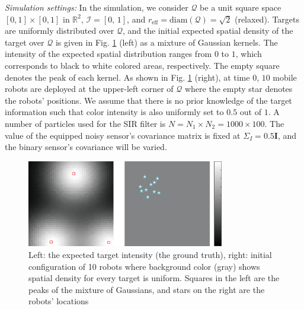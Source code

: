 \documentclass[journal]{IEEEtran}
\begin{document}
\textit{Simulation settings:}
In the simulation, we consider  $\mathcal{Q}$ be a unit square space $[0,1]\times [0,1]$ in $\mathbb{R}^2$, $\mathcal{I} = [0,\,1]$, and $r_{\text{eff}} = \text{diam}(\mathcal{Q})=\sqrt{2}$ (relaxed). 
Targets are uniformly distributed over $\mathcal{Q}$, and the initial expected spatial density of the target over $\mathcal{Q}$ is given in Fig. \ref{fig:fig1} (left) as a mixture of Gaussian kernels. The intensity of the expected spatial distribution ranges from $0$ to $1$, which corresponds to black to white colored areas, respectively. The empty square denotes the peak of each kernel.
As shown in Fig. \ref{fig:fig1} (right), at time $0$, $10$ mobile robots are deployed at the upper-left corner of $\mathcal{Q}$ where the empty star denotes the robots' positions. We assume that there is no prior knowledge of the target information such that color intensity is also uniformly set to $0.5$ out of $1$.
A number of particles used for the SIR filter is $N= N_1\times N_2 = 1000 \times 100$. The value of the equipped noisy sensor's covariance matrix is fixed at $\Sigma_I = 0.5\mathbf{I}$, and the binary sensor's covariance will be varied.
\begin{figure}
	\centering
	\includegraphics[width=3.4in]{figure/init_10_deploy}
	\caption{Left: the expected target intensity (the ground truth), right: initial configuration of 10 robots where background color (gray) shows spatial density for every target is uniform. Squares in the left are the peaks of the mixture of Gaussians, and stars on the right are the robots' locations} 
	\label{fig:fig1}
\end{figure}
\end{document}

